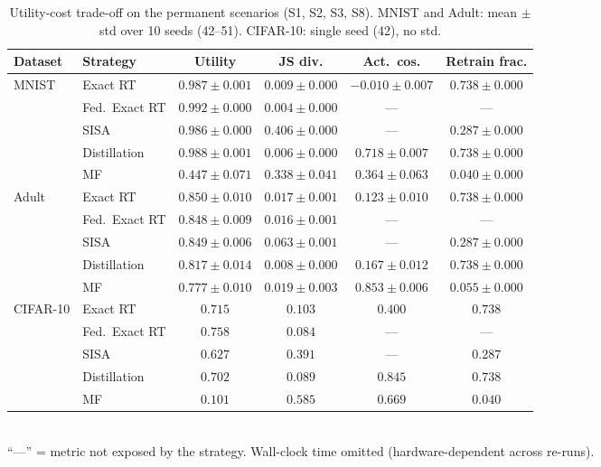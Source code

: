 \begin{table}[H]
\centering
\caption{Utility-cost trade-off on the permanent scenarios (S1, S2, S3, S8). MNIST and Adult: mean $\pm$ std over 10 seeds (42--51). CIFAR-10: single seed (42), no std.}
\label{tab:tradeoff}
\small
\renewcommand{\arraystretch}{1.2}
\begin{tabular}{@{} l l c c c c @{}}
\toprule
\textbf{Dataset} & \textbf{Strategy} & \textbf{Utility} & \textbf{JS div.} & \textbf{Act.\ cos.} & \textbf{Retrain frac.} \\
\midrule
\multirow{5}{*}{MNIST} & Exact RT & $0.987 \pm 0.001$ & $0.009 \pm 0.000$ & $-0.010 \pm 0.007$ & $0.738 \pm 0.000$ \\
 & Fed.\ Exact RT & $0.992 \pm 0.000$ & $0.004 \pm 0.000$ & --- & --- \\
 & SISA & $0.986 \pm 0.000$ & $0.406 \pm 0.000$ & --- & $0.287 \pm 0.000$ \\
 & Distillation & $0.988 \pm 0.001$ & $0.006 \pm 0.000$ & $0.718 \pm 0.007$ & $0.738 \pm 0.000$ \\
 & MF & $0.447 \pm 0.071$ & $0.338 \pm 0.041$ & $0.364 \pm 0.063$ & $0.040 \pm 0.000$ \\
\midrule
\multirow{5}{*}{Adult} & Exact RT & $0.850 \pm 0.010$ & $0.017 \pm 0.001$ & $0.123 \pm 0.010$ & $0.738 \pm 0.000$ \\
 & Fed.\ Exact RT & $0.848 \pm 0.009$ & $0.016 \pm 0.001$ & --- & --- \\
 & SISA & $0.849 \pm 0.006$ & $0.063 \pm 0.001$ & --- & $0.287 \pm 0.000$ \\
 & Distillation & $0.817 \pm 0.014$ & $0.008 \pm 0.000$ & $0.167 \pm 0.012$ & $0.738 \pm 0.000$ \\
 & MF & $0.777 \pm 0.010$ & $0.019 \pm 0.003$ & $0.853 \pm 0.006$ & $0.055 \pm 0.000$ \\
\midrule
\multirow{5}{*}{CIFAR-10} & Exact RT & $0.715$ & $0.103$ & $0.400$ & $0.738$ \\
 & Fed.\ Exact RT & $0.758$ & $0.084$ & --- & --- \\
 & SISA & $0.627$ & $0.391$ & --- & $0.287$ \\
 & Distillation & $0.702$ & $0.089$ & $0.845$ & $0.738$ \\
 & MF & $0.101$ & $0.585$ & $0.669$ & $0.040$ \\
\bottomrule
\end{tabular}
\\[2pt]
{\footnotesize ``---'' = metric not exposed by the strategy. Wall-clock time omitted (hardware-dependent across re-runs).}
\end{table}
